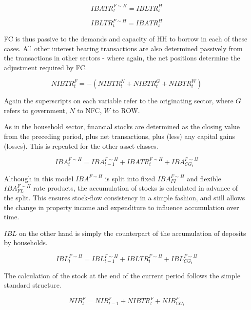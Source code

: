 \documentclass[
]{book}
\begin{document}
\begin{equation}
IBATR^{F\sim H}_t = IBLTR^H_t
\end{equation}

\begin{equation}
IBLTR^{F\sim H}_t = IBATR^H_t
\end{equation}

FC is thus passive to the demands and capacity of HH to borrow in each of these cases.
All other interest bearing transactions are also determined passively from the
transactions in other sectors - where again, the net positions determine the
adjustment required by FC.

\begin{equation}
NIBTR^F_t = -(NIBTR^N_t + NIBTR^G_t+ NIBTR^W_t )
\end{equation}

Again the superscripts on each variable refer to the originating sector,
where \(G\) refers to government, \(N\) to NFC, \(W\) to ROW.

As in the household sector, financial stocks are determined as the closing
value from the preceding period, plus net transactions, plus (less) any capital
gains (losses). This is repeated for the other asset classes.

\begin{equation}
IBA^{F\sim H}_t = IBA^{F\sim H}_{t-1} + IBATR^{F\sim H}_t + IBA^{F\sim H}_{CG_t}
\end{equation}

Although in this model \(IBA^{F\sim H}\) is split into fixed \(IBA_{FI}^{F\sim H}\) and
flexible \(IBA_{FL}^{F\sim H}\) rate products, the accumulation of stocks is calculated
in advance of the split. This ensures stock-flow consistency in a simple fashion, and
still allows the change in property income and expenditure to influence accumulation
over time.

\(IBL\) on the other hand is simply the counterpart of the accumulation of
deposits by households.

\begin{equation}
IBL^{F\sim H}_t = IBL^{F\sim H}_{t-1} + IBLTR^{F\sim H}_t + IBL^{F\sim H}_{CG_t}
\end{equation}

The calculation of the stock at the end of the current period follows the simple
standard structure.

\begin{equation}
NIB^F_t = NIB^F_{t-1} + NIBTR^F_t + NIB^F_{CG_t}
\end{equation}
\end{document}
